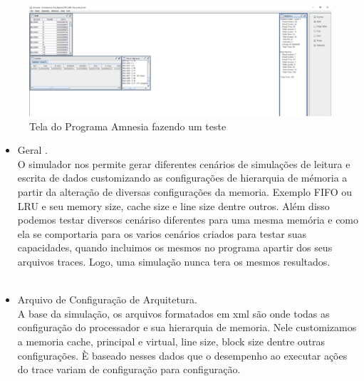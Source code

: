 \documentclass[conference]{IEEEtran}
\begin{document}
\begin{figure}[H]
  \includegraphics[width=\linewidth]{Amnesia_screen.png}
  \caption{Tela do Programa Amnesia fazendo um teste}
  \label{fig:Tela do Programa Amnesia fazendo um teste}
\end{figure}

\begin{itemize}
\item  
Geral . \\
O simulador nos permite gerar diferentes cenários de simulações de leitura e escrita de dados
customizando as configurações de hierarquia de mémoria a partir da alteração de diversas configurações da memoria. Exemplo FIFO ou LRU e seu memory size, cache size e line size dentre outros. Além disso podemos testar diversos cenáriso diferentes para uma mesma memória e como ela se comportaria para os varios cenários criados para testar suas capacidades, quando incluimos os mesmos no programa apartir dos seus arquivos traces. Logo, uma simulação nunca tera os mesmos resultados.\\
\\

\item Arquivo de Configuração de Arquitetura. \\
A base da simulação, os arquivos formatados em xml são onde todas as configuração do processador e sua hierarquia de memoria. Nele customizamos a memoria cache, principal e virtual, line size, block size dentre outras configurações. È baseado nesses dados que o desempenho ao executar ações do trace variam de configuração para configuração.
\\


\end{itemize}
\end{document}
